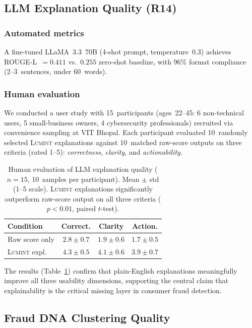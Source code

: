 \documentclass[conference]{IEEEtran}
\begin{document}
\subsection{LLM Explanation Quality (R14)}\label{sec:llm_eval}

\subsubsection{Automated metrics}
A fine-tuned LLaMA~3.3~70B (4-shot prompt, temperature~0.3) achieves
ROUGE-L~$=0.411$ vs.\ $0.255$ zero-shot baseline, with 96\% format
compliance (2--3~sentences, under 60~words).

\subsubsection{Human evaluation}
We conducted a user study with 15~participants (ages~22--45: 6
non-technical users, 5 small-business owners, 4 cybersecurity
professionals) recruited via convenience sampling at VIT Bhopal.
Each participant evaluated 10~randomly selected \textsc{Lumint}
explanations against 10~matched raw-score outputs on three criteria
(rated 1--5): \emph{correctness}, \emph{clarity}, and
\emph{actionability}.

\begin{table}[t]
\caption{Human evaluation of LLM explanation quality ($n{=}15$,
10~samples per participant). Mean $\pm$ std (1--5 scale).
\textsc{Lumint} explanations significantly outperform raw-score
output on all three criteria ($p{<}0.01$, paired $t$-test).}
\label{tab:human}
\centering
\small
\begin{tabular}{lccc}
\toprule
\textbf{Condition} & \textbf{Correct.}
  & \textbf{Clarity} & \textbf{Action.} \\
\midrule
Raw score only         & $2.8{\pm}0.7$ & $1.9{\pm}0.6$ & $1.7{\pm}0.5$ \\
\textsc{Lumint} expl.  & $\mathbf{4.3{\pm}0.5}$ & $\mathbf{4.1{\pm}0.6}$ & $\mathbf{3.9{\pm}0.7}$ \\
\bottomrule
\end{tabular}
\end{table}

The results (Table~\ref{tab:human}) confirm that plain-English
explanations meaningfully improve all three usability dimensions,
supporting the central claim that explainability is the critical missing
layer in consumer fraud detection.

\subsection{Fraud DNA Clustering Quality}\label{sec:frauddna_eval}
\end{document}
